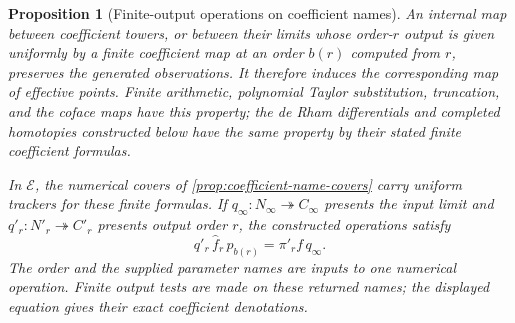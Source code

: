 \documentclass[11pt,a4paper]{article}
\numberwithin{algorithm}{section}
\numberwithin{equation}{section}
\newtheorem{proposition}[proposition]{Proposition}
\theoremstyle{definition}
\theoremstyle{remark}
\theoremstyle{plain}
\newcommand{\E}{\mathcal E}
\newcommand{\onto}{\twoheadrightarrow}
\theoremstyle{definition}
\theoremstyle{plain}
\begin{document}
\begin{proposition}[Finite-output operations on coefficient names]
\label{prop:formal-finite-output-tracking}
An internal map between coefficient towers, or between
their limits whose order-$r$ output is given uniformly by a finite
coefficient map at an order $b(r)$ computed from $r$, preserves the
generated observations.  It therefore induces the corresponding
map of effective points.  Finite arithmetic, polynomial Taylor
substitution, truncation, and the coface maps have this property;
the de Rham differentials and completed homotopies constructed
below have the same property by their stated finite coefficient
formulas.

In $\E$, the numerical covers of
\cref{prop:coefficient-name-covers} carry uniform trackers for
these finite formulas. If $q_\infty:N_\infty\onto C_\infty$
presents the input limit and $q'_r:N'_r\onto C'_r$ presents
output order $r$, the constructed operations satisfy
\[
 q'_r\,\widehat f_r\,p_{b(r)}
   =\pi'_r f\,q_\infty.
\]
The order and the supplied parameter names are inputs to one
numerical operation. Finite output tests are made on these
returned names; the displayed equation gives their exact
coefficient denotations.
\end{proposition}
\end{document}
